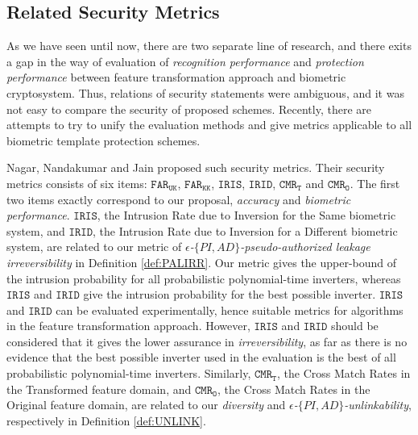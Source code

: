 \subsection{Related Security Metrics}
As we have seen until now, there are two separate line of research, and there exits a gap in the way of evaluation of  {\it recognition performance} and {\it protection performance} between feature transformation approach and biometric cryptosystem. 
Thus, relations of security statements were ambiguous, and it was not easy to compare the security of proposed schemes. Recently, there are attempts to try to unify the evaluation methods and give metrics applicable to all biometric template protection schemes. 

Nagar, Nandakumar and Jain\cite{Nagar:2010tg} proposed such security metrics. Their security metrics consists of six items: $\mathtt{FAR}_\mathtt{UK}$, $\mathtt{FAR}_\mathtt{KK}$, $\mathtt{IRIS}$, $\mathtt{IRID}$, $\mathtt{CMR}_\mathtt{T}$ and $\mathtt{CMR}_\mathtt{O}$. The first two items exactly correspond to our proposal, {\it accuracy} and {\it biometric performance}.  $\mathtt{IRIS}$, the Intrusion Rate due to Inversion for the Same biometric system, and $\mathtt{IRID}$, the Intrusion Rate due to Inversion for a Different biometric system, are related to our metric of {\it $\epsilon$-$\{PI, AD\}$-pseudo-authorized leakage irreversibility} in Definition \ref{def:PALIRR}. Our metric gives the upper-bound of the intrusion probability for all probabilistic polynomial-time inverters, whereas $\mathtt{IRIS}$ and $\mathtt{IRID}$ give the intrusion probability for the best possible inverter. $\mathtt{IRIS}$ and $\mathtt{IRID}$ can be evaluated experimentally, hence suitable metrics for algorithms in the feature transformation approach. However, $\mathtt{IRIS}$ and $\mathtt{IRID}$ should be considered that it gives the lower assurance in {\it irreversibility}, as far as there is no evidence that the best possible inverter used in the evaluation is the best of all probabilistic polynomial-time inverters. Similarly,  $\mathtt{CMR}_\mathtt{T}$, the Cross Match Rates in the Transformed feature domain, and $\mathtt{CMR}_\mathtt{O}$, the Cross Match Rates in the Original feature domain, are related to our {\it diversity} and {\it $\epsilon$-$\{PI, AD\}$-unlinkability}, respectively in Definition \ref{def:UNLINK}. 

